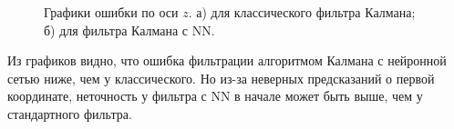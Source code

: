\documentclass[a4paper,11pt]{article} %
\begin{document}
 \begin{figure}[h]
\begin{minipage}[h]{0.49\linewidth}
\end{minipage}
\hfill
\begin{minipage}[h]{0.49\linewidth}
\end{minipage}
\caption{Графики ошибки по оси $z$. а) для классического фильтра Калмана; б) для фильтра Калмана с NN.}
\label{batlz}
\end{figure}

Из графиков видно, что ошибка фильтрации алгоритмом Калмана с нейронной сетью ниже, чем у классического.  Но из-за неверных предсказаний о первой координате, неточность у фильтра с NN в начале может быть выше, чем у стандартного фильтра.
\end{document}
